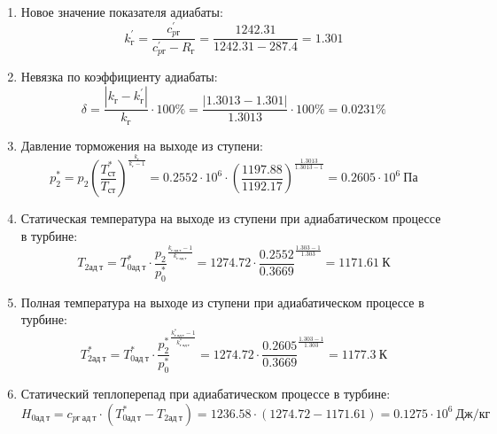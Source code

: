 \documentclass[a4paper,10pt]{article}
\begin{document}
\begin{enumerate}
        \item Новое значение показателя адиабаты:
        \[
            k_г^\prime = \frac{c_{pг}^\prime}{c_{pг}^\prime - R_г} =
                \frac{
                    1242.31
                }{
                    1242.31 - 287.4
                }
            = 1.301
        \]

        \item Невязка по коэффициенту адиабаты:
        \[
            \delta = \frac{ \left| k_г - k_г^\prime \right| }{ k_г } \cdot 100 \%=
                \frac{
                    \left| 1.3013 - 1.301 \right|
                }{
                    1.3013
                } \cdot 100 \% =
            0.0231 \%
        \]

        \item Давление торможения на выходе из ступени:
        \[
            p_2^* = p_2 \left(
                            \frac{ T_{ст}^* }{ T_{ст} }
                    \right) ^ \frac{ k_г }{ k_г - 1 } =
                 0.2552 \cdot 10^6 \cdot \left(
                            \frac{ 1197.88 }{ 1192.17 }
                    \right) ^
                \frac{ 1.3013 }{ 1.3013 - 1 } =
            0.2605 \cdot 10^6 \ Па
        \]

        \item Статическая температура на выходе из ступени при адиабатическом процессе в турбине:
        \[
            T_{2ад\ т} = T_{0ад\ т}^* \cdot \frac{p_2}{p_0^*} ^ {
                    \frac{k_{г\ ад\ т} - 1}{k_{г\ ад\ т} }
            } = 1274.72 \cdot
            \frac{ 0.2552
            }{
            0.3669
            } ^ {
                    \frac{1.303 - 1}{1.303}
            } =
            1171.61\ К
        \]

        \item Полная температура на выходе из ступени при адиабатическом процессе в турбине:
        \[
            T_{2ад\ т}^* = T_{0ад\ т}^* \cdot \frac{p_2^*}{p_0^*} ^ {
                    \frac{k_{г\ ад\ т}^* - 1}{k_{г\ ад\ т}^*}
            } = 1274.72 \cdot
            \frac{ 0.2605
            }{
            0.3669
            } ^ {
                    \frac{1.303 - 1}{1.303}
            } =
            1177.3\ К
        \]

        \item Статический теплоперепад при адиабатическом процессе в турбине:
        \[
            H_{0ад\ т} = c_{pг\ ад\ т} \cdot \left(
            T_{0ад\ т}^* - T_{2ад\ т}
            \right) =
            1236.58 \cdot \left(
            1274.72 - 1171.61
            \right) =
            0.1275 \cdot 10^6 \ Дж/кг
        \]


\end{enumerate}
\end{document}
